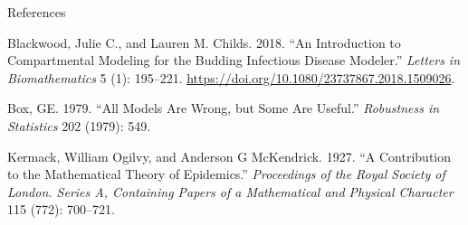 \documentclass[
  ignorenonframetext,
]{beamer}
\newlength{\cslhangindent}
\newenvironment{CSLReferences}[2] %
 {\begin{list}{}{%
  \setlength{\itemindent}{0pt}
  \setlength{\leftmargin}{0pt}
  \setlength{\parsep}{0pt}
  \ifodd #1
   \setlength{\leftmargin}{\cslhangindent}
   \setlength{\itemindent}{-1\cslhangindent}
  \fi
  \setlength{\itemsep}{#2\baselineskip}}}
 {\end{list}}
\begin{document}
\begin{frame}{References}
\label{references}
\label{refs}
\begin{CSLReferences}{1}{0}
Blackwood, Julie C., and Lauren M. Childs. 2018. {``An Introduction to
Compartmental Modeling for the Budding Infectious Disease Modeler.''}
\emph{Letters in Biomathematics} 5 (1): 195--221.
\url{https://doi.org/10.1080/23737867.2018.1509026}.

Box, GE. 1979. {``All Models Are Wrong, but Some Are Useful.''}
\emph{Robustness in Statistics} 202 (1979): 549.

Kermack, William Ogilvy, and Anderson G McKendrick. 1927. {``A
Contribution to the Mathematical Theory of Epidemics.''}
\emph{Proceedings of the Royal Society of London. Series A, Containing
Papers of a Mathematical and Physical Character} 115 (772): 700--721.

\end{CSLReferences}
\end{frame}
\end{document}
